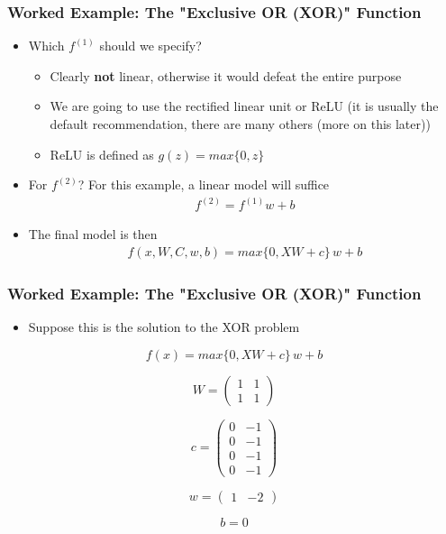 \documentclass[
  shownotes,
  xcolor={svgnames},
  hyperref={colorlinks,citecolor=DarkBlue,linkcolor=DarkRed,urlcolor=DarkBlue}
  , aspectratio=169]{beamer}
\begin{document}
\begin{frame}
\frametitle{Worked Example: The "Exclusive OR (XOR)" Function}

\begin{itemize}
    \item Which $f^{(1)}$ should we specify?
    \medskip
    \begin{itemize}
    \item Clearly {\bf not} linear, otherwise it would defeat the entire purpose
    \item We are going to use the rectified linear unit or ReLU (it is usually the default recommendation, there are many others (more on this later))
    \item ReLU is defined as $g(z)=max\{0,z\}$
    \end{itemize}
    
    \item For $f^{(2)}$? For this example, a linear model will suffice 
    \medskip
    \begin{align}
    f^{(2)} = f^{(1)}w + b
    \end{align}
    \item The final model is then 
    \begin{align}
    f(x,W,C,w,b) = max\{0,XW+c\}\,w + b
    \end{align}
\end{itemize}

\end{frame}
\begin{frame}
\frametitle{Worked Example: The "Exclusive OR (XOR)" Function}

\begin{itemize}
\item Suppose this is the solution to the XOR problem 
\end{itemize}


\[
f(x)=max\{0,XW+c\}\,w+b
\]

\[
W=\left(\begin{array}{cc}
1 & 1\\
1 & 1
\end{array}\right)
\]

\[
c=\left(\begin{array}{cc}
0 & -1\\
0 & -1\\
0 & -1\\
0 & -1
\end{array}\right)
\]

\[
w=\left(\begin{array}{cc}
1 & -2\end{array}\right)
\]

 \[
 b = 0
 \]


\end{frame}
\end{document}
